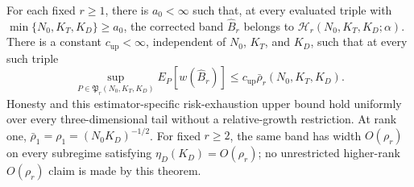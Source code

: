 For each fixed \(r\ge1\), there is \(a_0<\infty\) such that, at every evaluated triple with \(\min\{N_0,K_T,K_D\}\ge a_0\), the corrected band \(\widehat B_r\) belongs to \(\mathcal H_r(N_0,K_T,K_D;\alpha)\).  There is a constant \(c_{\mathrm{up}}<\infty\), independent of \(N_0\), \(K_T\), and \(K_D\), such that at every such triple
\[
 \sup_{P\in\mathfrak P_r(N_0,K_T,K_D)}E_P[w(\widehat B_r)]
 \le c_{\mathrm{up}}\bar\rho_r(N_0,K_T,K_D).
\]
Honesty and this estimator-specific risk-exhaustion upper bound hold uniformly over every three-dimensional tail without a relative-growth restriction.  At rank one, \(\bar\rho_1=\rho_1=(N_0K_D)^{-1/2}\).  For fixed \(r\ge2\), the same band has width \(O(\rho_r)\) on every subregime satisfying \(\eta_D(K_D)=O(\rho_r)\); no unrestricted higher-rank \(O(\rho_r)\) claim is made by this theorem.